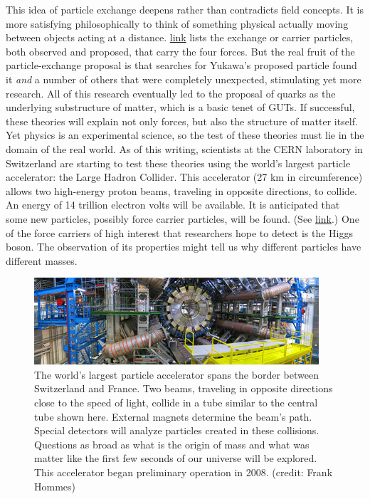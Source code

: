 \documentclass[
]{book}
\begin{document}
This idea of particle exchange deepens rather than contradicts field
concepts. It is more satisfying philosophically to think of something
physical actually moving between objects acting at a distance.
\protect\hyperlink{import-auto-id1588108}{link} lists the
exchange or \protect\hypertarget{import-auto-id1561662}{}{carrier particles}, both observed and proposed, that carry the four
forces. But the real fruit of the particle-exchange proposal is that
searches for Yukawa's proposed particle found it \emph{and} a number of
others that were completely unexpected, stimulating yet more research.
All of this research eventually led to the proposal of quarks as the
underlying substructure of matter, which is a basic tenet of GUTs. If
successful, these theories will explain not only forces, but also the
structure of matter itself. Yet physics is an experimental science, so
the test of these theories must lie in the domain of the real world. As
of this writing, scientists at the CERN laboratory in Switzerland are
starting to test these theories using the world's largest particle
accelerator: the Large Hadron Collider. This accelerator (27 km in
circumference) allows two high-energy proton beams, traveling in
opposite directions, to collide. An energy of 14 trillion electron volts
will be available. It is anticipated that some new particles, possibly
force carrier particles, will be found. (See
\protect\hyperlink{import-auto-id2658974}{link}.) One of the
force carriers of high interest that researchers hope to detect is the
Higgs boson. The observation of its properties might tell us why
different particles have different masses.

\begin{figure}
\hypertarget{import-auto-id2658974}{%
\centering
\includegraphics{images/Figure_04_08_03.jpg}
\caption{The world's largest particle accelerator spans the border between
Switzerland and France. Two beams, traveling in opposite directions
close to the speed of light, collide in a tube similar to the central
tube shown here. External magnets determine the beam's path. Special
detectors will analyze particles created in these collisions. Questions
as broad as what is the origin of mass and what was matter like the
first few seconds of our universe will be explored. This accelerator
began preliminary operation in 2008. (credit: Frank
Hommes)}\label{import-auto-id2658974}
}
\end{figure}
\end{document}
